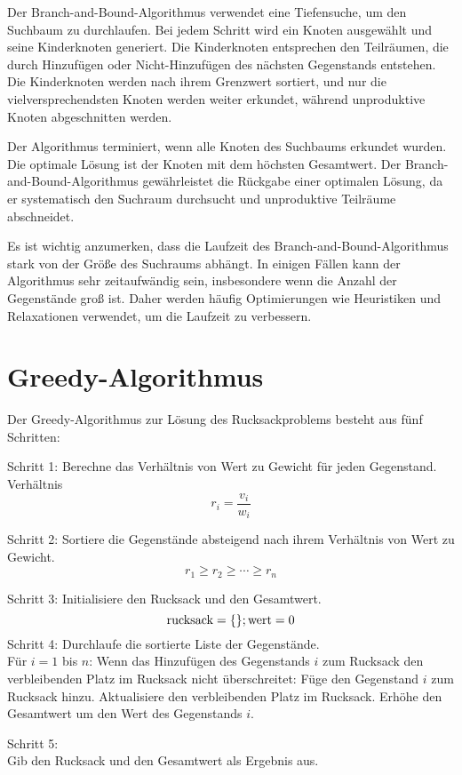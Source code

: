 Der Branch-and-Bound-Algorithmus verwendet eine Tiefensuche, 
um den Suchbaum zu durchlaufen. Bei jedem Schritt wird ein 
Knoten ausgewählt und seine Kinderknoten generiert. Die 
Kinderknoten entsprechen den Teilräumen, die durch 
Hinzufügen oder Nicht-Hinzufügen des nächsten Gegenstands 
entstehen. Die Kinderknoten werden nach ihrem Grenzwert 
sortiert, und nur die vielversprechendsten Knoten werden 
weiter erkundet, während unproduktive Knoten abgeschnitten 
werden.

Der Algorithmus terminiert, wenn alle Knoten des Suchbaums 
erkundet wurden. Die optimale Lösung ist der Knoten mit dem 
höchsten Gesamtwert. Der Branch-and-Bound-Algorithmus 
gewährleistet die Rückgabe einer optimalen Lösung, da er 
systematisch den Suchraum durchsucht und unproduktive 
Teilräume abschneidet.

Es ist wichtig anzumerken, dass die Laufzeit des 
Branch-and-Bound-Algorithmus stark von der Größe des 
Suchraums abhängt. In einigen Fällen kann der Algorithmus 
sehr zeitaufwändig sein, insbesondere wenn die Anzahl der 
Gegenstände groß ist. Daher werden häufig Optimierungen wie 
Heuristiken und Relaxationen verwendet, um die Laufzeit zu 
verbessern.\ \cite[vgl.]{Martello1987}
\section{Greedy-Algorithmus}
Der Greedy-Algorithmus zur Lösung des Rucksackproblems besteht 
aus fünf Schritten:

Schritt 1: Berechne das Verhältnis von Wert zu Gewicht für 
jeden Gegenstand.
Verhältnis \[r_i = \frac{v_i}{w_i}\]

Schritt 2: Sortiere die Gegenstände absteigend nach ihrem 
Verhältnis von Wert zu Gewicht.
\[r_1 \geq r_2 \geq \cdots \geq r_n\]

Schritt 3: Initialisiere den Rucksack und den Gesamtwert.
\[   \text{rucksack} = \{\}; \\
    \text{wert} = 0 \]
Schritt 4: Durchlaufe die sortierte Liste der Gegenstände.\\
Für $i = 1$ bis $n$: 
Wenn das Hinzufügen des Gegenstands $i$ zum Rucksack den 
verbleibenden Platz im Rucksack nicht überschreitet:
Füge den Gegenstand $i$ zum Rucksack hinzu.
Aktualisiere den verbleibenden Platz im Rucksack.
Erhöhe den Gesamtwert um den Wert des Gegenstands $i$.

Schritt 5: \\Gib den Rucksack und den Gesamtwert als Ergebnis 
aus.

